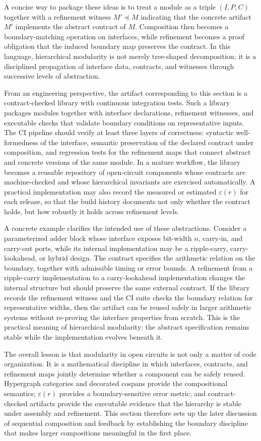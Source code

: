 \documentclass[11pt]{article}
\begin{document}
A concise way to package these ideas is to treat a module as a triple \((I,P,C)\) together with a refinement witness \(M' \preceq M\) indicating that the concrete artifact \(M'\) implements the abstract contract of \(M\). Composition then becomes a boundary-matching operation on interfaces, while refinement becomes a proof obligation that the induced boundary map preserves the contract. In this language, hierarchical modularity is not merely tree-shaped decomposition; it is a disciplined propagation of interface data, contracts, and witnesses through successive levels of abstraction.

From an engineering perspective, the artifact corresponding to this section is a contract-checked library with continuous integration tests. Such a library packages modules together with interface declarations, refinement witnesses, and executable checks that validate boundary conditions on representative inputs. The CI pipeline should verify at least three layers of correctness: syntactic well-formedness of the interface, semantic preservation of the declared contract under composition, and regression tests for the refinement maps that connect abstract and concrete versions of the same module. In a mature workflow, the library becomes a reusable repository of open-circuit components whose contracts are machine-checked and whose hierarchical invariants are exercised automatically. A practical implementation may also record the measured or estimated \(\varepsilon(r)\) for each release, so that the build history documents not only whether the contract holds, but how robustly it holds across refinement levels.

A concrete example clarifies the intended use of these abstractions. Consider a parameterized adder block whose interface exposes bit-width \(n\), carry-in, and carry-out ports, while its internal implementation may be a ripple-carry, carry-lookahead, or hybrid design. The contract specifies the arithmetic relation on the boundary, together with admissible timing or error bounds. A refinement from a ripple-carry implementation to a carry-lookahead implementation changes the internal structure but should preserve the same external contract. If the library records the refinement witness and the CI suite checks the boundary relation for representative widths, then the artifact can be reused safely in larger arithmetic systems without re-proving the interface properties from scratch. This is the practical meaning of hierarchical modularity: the abstract specification remains stable while the implementation evolves beneath it.

The overall lesson is that modularity in open circuits is not only a matter of code organization. It is a mathematical discipline in which interfaces, contracts, and refinement maps jointly determine whether a component can be safely reused. Hypergraph categories and decorated cospans provide the compositional semantics; \(\varepsilon(r)\) provides a boundary-sensitive error metric; and contract-checked artifacts provide the executable evidence that the hierarchy is stable under assembly and refinement. This section therefore sets up the later discussion of sequential composition and feedback by establishing the boundary discipline that makes larger compositions meaningful in the first place.
\end{document}
